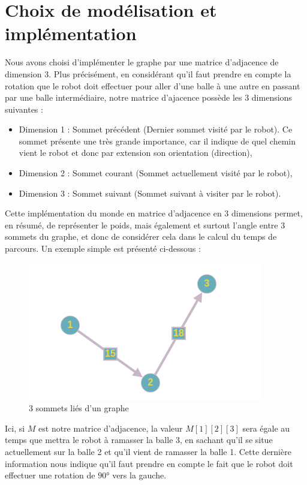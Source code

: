 \documentclass[12pt]{article}
\begin{document}
    \section{Choix de modélisation et implémentation}
    \label{sec:model_impl}

    Nous avons choisi d'implémenter le graphe par une matrice d'adjacence de dimension 3. Plus précisément, en considérant qu'il faut prendre en compte la rotation que le robot doit effectuer pour aller d'une balle à une autre en passant par une balle intermédiaire, notre matrice d'ajacence possède les 3 dimensions suivantes :

    \begin{itemize}
        \item Dimension 1 : Sommet précédent (Dernier sommet visité par le robot). Ce sommet présente une très grande importance, car il indique de quel chemin vient le robot et donc par extension son orientation (direction),
        \item Dimension 2 : Sommet courant (Sommet actuellement visité par le robot),
        \item Dimension 3 : Sommet suivant (Sommet suivant à visiter par le robot).
    \end{itemize}

    Cette implémentation du monde en matrice d'adjacence en 3 dimensions permet, en résumé, de représenter le poids, mais également et surtout l'angle entre 3 sommets du graphe, et donc de considérer cela dans le calcul du temps de parcours. Un exemple simple est présenté ci-dessous :

    \begin{figure}[H]
        \centering
        \includegraphics[scale=0.7]{img/example_3dim}
        \caption{3 sommets liés d'un graphe}
        \label{img_3somlinked}
    \end{figure}

    Ici, si $M$ est notre matrice d'adjacence, la valeur $M[1][2][3]$ sera égale au temps que mettra le robot à ramasser la balle 3, en sachant qu'il se situe actuellement sur la balle 2 et qu'il vient de ramasser la balle 1. Cette dernière information nous indique qu'il faut prendre en compte le fait que le robot doit effectuer une rotation de $90$° vers la gauche.
\end{document}
